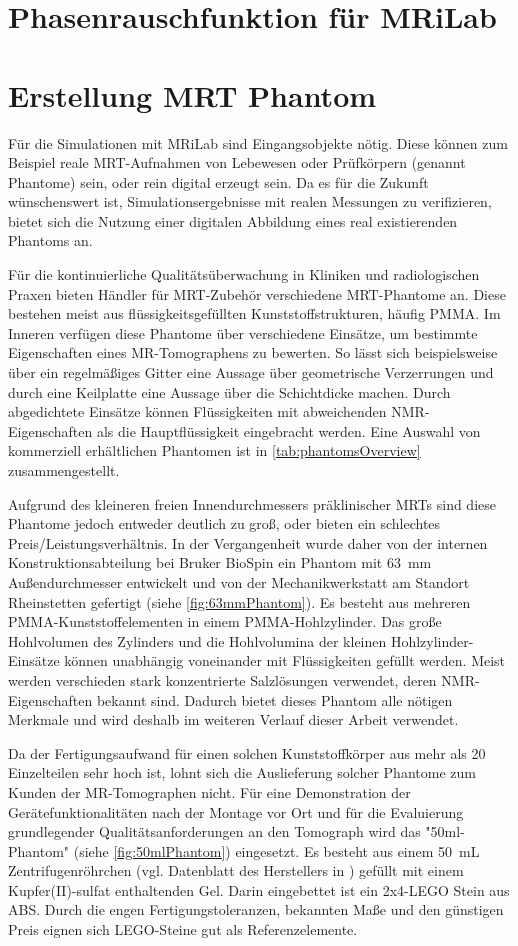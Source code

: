 \section{Phasenrauschfunktion für MRiLab}

\section{Erstellung MRT Phantom}
Für die Simulationen mit MRiLab sind Eingangsobjekte nötig. Diese können zum Beispiel reale MRT-Aufnahmen von Lebewesen oder Prüfkörpern (genannt Phantome) sein, oder rein digital erzeugt sein. Da es für die Zukunft wünschenswert ist, Simulationsergebnisse mit realen Messungen zu verifizieren, bietet sich die Nutzung einer digitalen Abbildung eines real existierenden Phantoms an.

Für die kontinuierliche Qualitätsüberwachung in Kliniken und radiologischen Praxen bieten Händler für MRT-Zubehör verschiedene MRT-Phantome an. Diese bestehen meist aus flüssigkeitsgefüllten Kunststoffstrukturen, häufig PMMA. Im Inneren verfügen diese Phantome über verschiedene Einsätze, um bestimmte Eigenschaften eines MR-Tomographens zu bewerten. So lässt sich beispielsweise über ein regelmäßiges Gitter eine Aussage über geometrische Verzerrungen und durch eine Keilplatte eine Aussage über die Schichtdicke machen. Durch abgedichtete Einsätze können Flüssigkeiten mit abweichenden NMR-Eigenschaften als die Hauptflüssigkeit eingebracht werden. Eine Auswahl von kommerziell erhältlichen Phantomen ist in \autoref{tab:phantomsOverview} zusammengestellt.

Aufgrund des kleineren freien Innendurchmessers präklinischer MRTs sind diese Phantome jedoch entweder deutlich zu groß, oder bieten ein schlechtes Preis/Leistungsverhältnis. In der Vergangenheit wurde daher von der internen Konstruktionsabteilung bei Bruker BioSpin ein Phantom mit \SI{63}{\mm} Außendurchmesser entwickelt und von der Mechanikwerkstatt am Standort Rheinstetten gefertigt (siehe \autoref{fig:63mmPhantom}). Es besteht aus mehreren PMMA-Kunststoffelementen in einem PMMA-Hohlzylinder. Das große Hohlvolumen des Zylinders und die Hohlvolumina der kleinen Hohlzylinder-Einsätze können unabhängig voneinander mit Flüssigkeiten gefüllt werden. Meist werden verschieden stark konzentrierte Salzlösungen verwendet, deren NMR-Eigenschaften bekannt sind. Dadurch bietet dieses Phantom alle nötigen Merkmale und wird deshalb im weiteren Verlauf dieser Arbeit verwendet.

 Da der Fertigungsaufwand für einen solchen Kunststoffkörper aus mehr als 20 Einzelteilen sehr hoch ist, lohnt sich die Auslieferung solcher Phantome zum Kunden der MR-Tomographen nicht. Für eine Demonstration der Gerätefunktionalitäten nach der Montage vor Ort und für die Evaluierung grundlegender Qualitätsanforderungen an den Tomograph wird das "50ml-Phantom" (siehe \autoref{fig:50mlPhantom}) eingesetzt. Es besteht aus einem \SI{50}{\milli\liter} Zentrifugenröhrchen (vgl. Datenblatt des Herstellers in \cite{corningCentriStar}) gefüllt mit einem Kupfer(II)-sulfat enthaltenden Gel. Darin eingebettet ist ein 2x4-LEGO Stein aus ABS. Durch die engen Fertigungstoleranzen, bekannten Maße und den günstigen Preis eignen sich LEGO-Steine gut als Referenzelemente.

